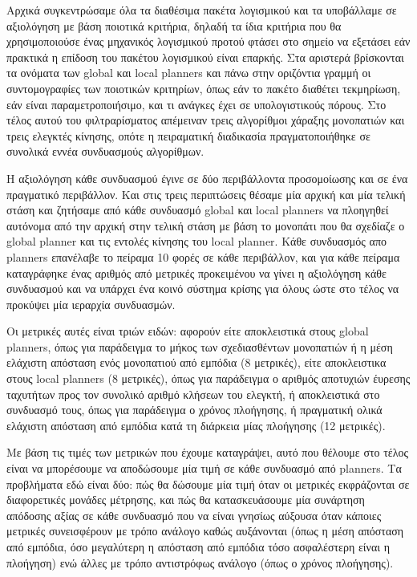 \documentclass[a4paper,10pt]{article}
\begin{document}
Αρχικά συγκεντρώσαμε όλα τα διαθέσιμα πακέτα λογισμικού και τα υποβάλλαμε σε
αξιολόγηση με βάση ποιοτικά κριτήρια, δηλαδή τα ίδια κριτήρια που θα
χρησιμοποιούσε ένας μηχανικός λογισμικού προτού φτάσει στο σημείο να εξετάσει
εάν πρακτικά η επίδοση του πακέτου λογισμικού είναι επαρκής.  Στα αριστερά
βρίσκονται τα ονόματα των global και local planners και πάνω στην οριζόντια
γραμμή οι συντομογραφίες των ποιοτικών κριτηρίων, όπως εάν το πακέτο διαθέτει
τεκμηρίωση, εάν είναι παραμετροποιήσιμο, και τι ανάγκες έχει σε υπολογιστικούς
πόρους. Στο τέλος αυτού του φιλτραρίσματος απέμειναν τρεις αλγορίθμοι χάραξης
μονοπατιών και τρεις ελεγκτές κίνησης, οπότε η πειραματική διαδικασία
πραγματοποιήθηκε σε συνολικά εννέα συνδυασμούς αλγορίθμων.

Η αξιολόγηση κάθε συνδυασμού έγινε σε δύο περιβάλλοντα προσομοίωσης και σε ένα
πραγματικό περιβάλλον. Και στις τρεις περιπτώσεις θέσαμε μία αρχική και μία
τελική στάση και ζητήσαμε από κάθε συνδυασμό global και local planners να
πλοηγηθεί αυτόνομα από την αρχική στην τελική στάση με βάση το μονοπάτι που θα
σχεδίαζε ο global planner και τις εντολές κίνησης του local planner. Κάθε
συνδυασμός απο planners επανέλαβε το πείραμα 10 φορές σε κάθε περιβάλλον, και
για κάθε πείραμα καταγράφηκε ένας αριθμός από μετρικές προκειμένου να γίνει η
αξιολόγηση κάθε συνδυασμού και να υπάρχει ένα κοινό σύστημα κρίσης για όλους
ώστε στο τέλος να προκύψει μία ιεραρχία συνδυασμών.

Οι μετρικές αυτές είναι τριών ειδών: αφορούν είτε αποκλειστικά στους global
planners, όπως για παράδειγμα το μήκος των σχεδιασθέντων μονοπατιών ή η μέση
ελάχιστη απόσταση ενός μονοπατιού από εμπόδια (8 μετρικές), είτε αποκλειστικα
στους local planners (8 μετρικές), όπως για παράδειγμα ο αριθμός αποτυχιών
έυρεσης ταχυτήτων προς τον συνολικό αριθμό κλήσεων του ελεγκτή, ή αποκλειστικά
στο συνδυασμό τους, όπως για παράδειγμα ο χρόνος πλοήγησης, ή πραγματική ολικά
ελάχιστη απόσταση από εμπόδια κατά τη διάρκεια μίας πλοήγησης (12 μετρικές).

Με βάση τις τιμές των μετρικών που έχουμε καταγράψει, αυτό που θέλουμε στο
τέλος είναι να μπορέσουμε να αποδώσουμε μία τιμή σε κάθε συνδυασμό από
planners.  Τα προβλήματα εδώ είναι δύο: πώς θα δώσουμε μία τιμή όταν οι
μετρικές εκφράζονται σε διαφορετικές μονάδες μέτρησης, και πώς θα
κατασκευάσουμε μία συνάρτηση απόδοσης αξίας σε κάθε συνδυασμό που να είναι
γνησίως αύξουσα όταν κάποιες μετρικές συνεισφέρουν με τρόπο ανάλογο καθώς
αυξάνονται (όπως η μέση απόσταση από εμπόδια, όσο μεγαλύτερη η απόσταση από
εμπόδια τόσο ασφαλέστερη είναι η πλοήγηση) ενώ άλλες με τρόπο αντιστρόφως
ανάλογο (όπως ο χρόνος πλοήγησης).
\end{document}
